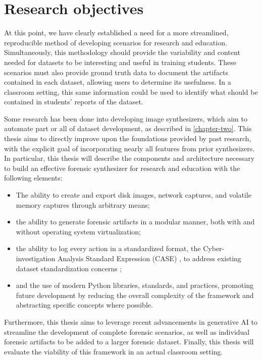 \documentclass[letterpaper,12pt]{report}
\def\tightlist{}
\begin{document}
\section{Research objectives}\label{research-objectives}

At this point, we have clearly established a need for a more
streamlined, reproducible method of developing scenarios for research
and education. Simultaneously, this methodology should provide the
variability and content needed for datasets to be interesting and useful
in training students. These scenarios must also provide ground truth
data to document the artifacts contained in each dataset, allowing users
to determine its usefulness. In a classroom setting, this same
information could be used to identify what should be contained in
students' reports of the dataset.

Some research has been done into developing image synthesizers, which
aim to automate part or all of dataset development, as described in
\autoref{chapter-two}. This thesis aims to directly improve
upon the foundations provided by past research, with the explicit goal
of incorporating nearly all features from prior synthesizers. In
particular, this thesis will describe the components and architecture
necessary to build an effective forensic synthesizer for research and
education with the following elements:

\begin{itemize}
\tightlist
\item
  The ability to create and export disk images, network captures, and
  volatile memory captures through arbitrary means;
\item
  the ability to generate forensic artifacts in a modular manner, both
  with and without operating system virtualization;
\item
  the ability to log every action in a standardized format, the
  Cyber-investigation Analysis Standard Expression (CASE)
  \cite{caseyAdvancingCoordinatedCyberinvestigations2017}, to
  address existing dataset standardization concerns
  \cite{horsmanDatasetConstructionChallenges2021};
\item
  and the use of modern Python libraries, standards, and practices,
  promoting future development by reducing the overall complexity of the
  framework and abstracting specific concepts where possible.
\end{itemize}

Furthermore, this thesis aims to leverage recent advancements in
generative AI to streamline the development of complete forensic
scenarios, as well as individual forensic artifacts to be added to a
larger forensic dataset. Finally, this thesis will evaluate the
viability of this framework in an actual classroom setting.
\end{document}
